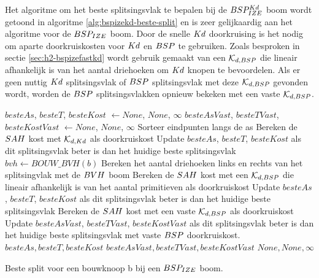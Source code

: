 Het algoritme om het beste splitsingsvlak te bepalen bij de $BSP^{Kd}_{IZE}$ boom wordt getoond in algoritme \ref{alg:bspizekd-beste-split} en is zeer gelijkaardig aan het algoritme voor de $BSP_{IZE}$ boom.
Door de snelle $Kd$ doorkruising is het nodig om aparte doorkruiskosten voor $Kd$ en $BSP$ te gebruiken.
Zoals besproken in sectie \ref{sec:h2-bspizefastkd} wordt gebruik gemaakt van een $\mathcal{K}_{d,BSP}$ die lineair afhankelijk is van het aantal driehoeken om $Kd$ knopen te bevoordelen.
Als er geen nuttig $Kd$ splitsingsvlak of $BSP$ splitsingsvlak met deze $\mathcal{K}_{d,BSP}$ gevonden wordt, worden de $BSP$ splitsingsvlakken opnieuw bekeken met een vaste $\mathcal{K}_{d,BSP}$.
\begin{dutchalgorithm}
    \begin{algorithmic}       
            \State $besteAs$, $besteT$, $besteKost$ $\gets None$, $None$, $\infty$
            \State $besteAsVast$, $besteTVast$, $besteKostVast$ $\gets None$, $None$, $\infty$
                \State Sorteer eindpunten langs de as
                    \State Bereken de $SAH$ kost met $\mathcal{K}_{d,Kd}$ als doorkruiskost
                    \State Update $besteAs$, $besteT$, $besteKost$ als dit splitsingsvlak beter is dan het huidige beste splitsingsvlak
                \EndFor        
            \EndFor
            \State $bvh \gets BOUW\_BVH(b)$
                    \State Bereken het aantal driehoeken links en rechts van het splitsingvlak met de $BVH$ boom
                    \State Bereken de $SAH$ kost met een $\mathcal{K}_{d,BSP}$ die lineair afhankelijk is van het aantal primitieven als doorkruiskost 
                    \State Update $besteAs$, $besteT$, $besteKost$ als dit splitsingsvlak beter is dan het huidige beste splitsingsvlak    
                    \State Bereken de $SAH$ kost met een vaste $\mathcal{K}_{d,BSP}$ als doorkruiskost
                    \State Update $besteAsVast$, $besteTVast$, $besteKostVast$ als dit splitsingsvlak beter is dan het huidige beste splitsingsvlak met vaste $BSP$ doorkruiskost.             
                \EndFor       
            \EndFor
                \State \Return $besteAs, besteT, besteKost$
            \EndIf
                \State \Return $besteAsVast, besteTVast, besteKostVast$
            \EndIf
            \State \Return $None, None, \infty$
        \EndFunction
    \end{algorithmic}
    \caption{Beste split voor een bouwknoop b bij een $BSP_{IZE}$ boom.}
    \label{alg:bspizekd-beste-split}
\end{dutchalgorithm}


